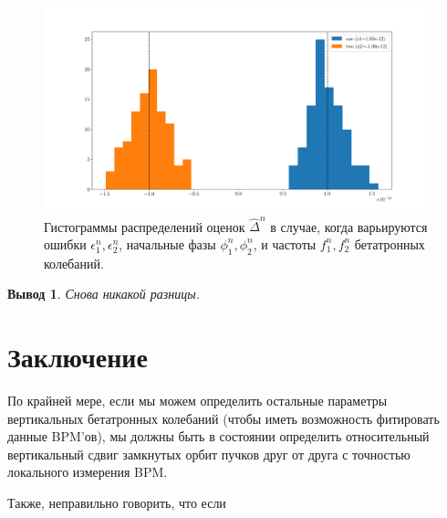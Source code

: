 \documentclass[12pt]{report}
\newcommand{\ntrl}{n}
\newtheorem{concl}{Вывод}
\begin{document}
\begin{figure}[h]\centering
	\includegraphics[width=\linewidth]{../../img/Koop/CO_offset_b1_b2_hist_vary_+phis+freqs}
	\caption{Гистограммы распределений оценок $\hat{\Delta}^{\ntrl}$ в случае, когда варьируются ошибки $\epsilon_1^{\ntrl},\epsilon_2^{\ntrl}$, начальные фазы $\phi_1^{\ntrl},\phi_2^{\ntrl}$, и частоты $f_1^{\ntrl},f_2^{\ntrl}$ бетатронных колебаний. \label{fig:vary_+phis+freqs}}
\end{figure}

\begin{concl}
	Снова никакой разницы.
\end{concl}

\section{Заключение}
По крайней мере, если мы можем определить остальные параметры вертикальных бетатронных колебаний (чтобы иметь возможность фитировать данные BPM'ов), мы должны быть в состоянии определить относительный вертикальный сдвиг замкнутых орбит пучков друг от друга с точностью локального измерения BPM.

Также, неправильно говорить, что если 
\end{document}
